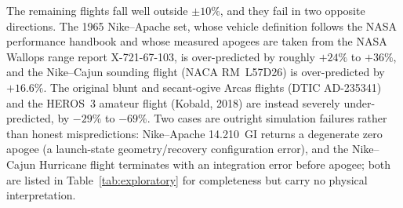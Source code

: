 The remaining flights fall well outside $\pm10\%$, and they fail in two opposite
directions. The 1965 Nike--Apache set, whose vehicle definition follows the
NASA performance handbook \cite{nasa_x721_66_568} and whose measured apogees are
taken from the NASA Wallops range report X-721-67-103, is over-predicted by
roughly $+24\%$ to $+36\%$, and the Nike--Cajun sounding flight (NACA RM~L57D26)
is over-predicted by $+16.6\%$. The original blunt and secant-ogive Arcas flights
(DTIC AD-235341) and the HEROS~3 amateur flight (Kobald, 2018) are instead
severely under-predicted, by $-29\%$ to $-69\%$. Two cases are outright
simulation failures rather than
honest mispredictions: Nike--Apache 14.210~GI returns a degenerate zero apogee
(a launch-state geometry/recovery configuration error), and the Nike--Cajun
Hurricane flight terminates with an integration error before apogee; both are
listed in Table~\ref{tab:exploratory} for completeness but carry no physical
interpretation.

